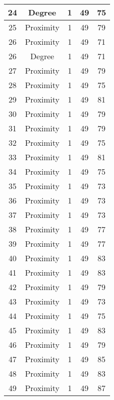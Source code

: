 \documentclass[results.tex]{subfiles}
\begin{document}
\begin{center}
\begin{tabular}{| c || c | c | c | c |}
    \hline
    24 & Degree & 1 & 49 & 75 \\ 
    \hline
    25 & Proximity & 1 & 49 & 79 \\ 
    \hline
    26 & Proximity & 1 & 49 & 71 \\ 
    \hline
    26 & Degree & 1 & 49 & 71 \\ 
    \hline
    27 & Proximity & 1 & 49 & 79 \\ 
    \hline
    28 & Proximity & 1 & 49 & 75 \\ 
    \hline
    29 & Proximity & 1 & 49 & 81 \\ 
    \hline
    30 & Proximity & 1 & 49 & 79 \\ 
    \hline
    31 & Proximity & 1 & 49 & 79 \\ 
    \hline
    32 & Proximity & 1 & 49 & 75 \\ 
    \hline
    33 & Proximity & 1 & 49 & 81 \\ 
    \hline
    34 & Proximity & 1 & 49 & 75 \\ 
    \hline
    35 & Proximity & 1 & 49 & 73 \\ 
    \hline
    36 & Proximity & 1 & 49 & 73 \\ 
    \hline
    37 & Proximity & 1 & 49 & 73 \\ 
    \hline
    38 & Proximity & 1 & 49 & 77 \\ 
    \hline
    39 & Proximity & 1 & 49 & 77 \\ 
    \hline
    40 & Proximity & 1 & 49 & 83 \\ 
    \hline
    41 & Proximity & 1 & 49 & 83 \\ 
    \hline
    42 & Proximity & 1 & 49 & 79 \\ 
    \hline
    43 & Proximity & 1 & 49 & 73 \\ 
    \hline
    44 & Proximity & 1 & 49 & 75 \\ 
    \hline
    45 & Proximity & 1 & 49 & 83 \\ 
    \hline
    46 & Proximity & 1 & 49 & 79 \\ 
    \hline
    47 & Proximity & 1 & 49 & 85 \\ 
    \hline
    48 & Proximity & 1 & 49 & 83 \\ 
    \hline
    49 & Proximity & 1 & 49 & 87 \\ 
    \hline   \end{tabular}
\end{center}
\end{document}

